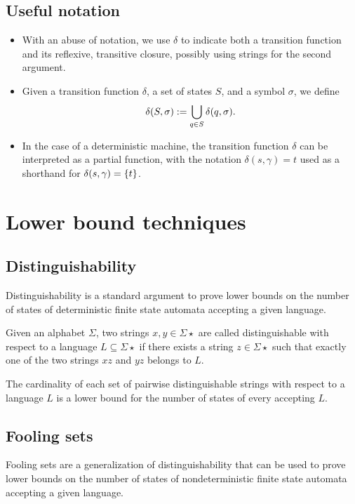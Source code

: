 \subsection{Useful notation}
\begin{itemize}
	\item With an abuse of notation, we use $\delta$ to indicate both a transition function and its reflexive, transitive closure, possibly using strings for the second argument.
	\item Given a transition function $\delta$, a set of states $S$, and a symbol $\sigma$, we define
	      \begin{equation*}
		      \delta(S,\sigma):=\bigcup_{q\in S} \delta(q,\sigma) \text.
	      \end{equation*}
	\item In the case of a deterministic machine, the transition function $\delta$ can be interpreted as a partial function, with the notation $\delta(s,\gamma)=t$ used as a shorthand for $\delta(s,\gamma)=\{t\}$.
\end{itemize}



\section{Lower bound techniques}


\subsection{Distinguishability}\label{sub:distinguishability}
Distinguishability is a standard argument to prove lower bounds on the number of states of deterministic finite state automata accepting a given language.
\begin{defn}
	Given an alphabet $\Sigma$, two strings $x,y\in\Sigma\star$ are called distinguishable with respect to a language $L\subseteq\Sigma\star$ if there exists a string $z\in\Sigma\star$ such that exactly one of the two strings $xz$ and $yz$ belongs to $L$.
\end{defn}
\begin{thrm}
	The cardinality of each set of pairwise distinguishable strings with respect to a language $L$ is a lower bound for the number of states of every \ODFA accepting $L$.
\end{thrm}


\subsection{Fooling sets}\label{sub:foolingsets}
Fooling sets are a generalization of distinguishability that can be used to prove lower bounds on the number of states of nondeterministic finite state automata accepting a given language.

